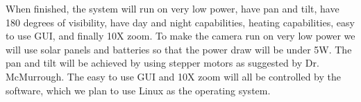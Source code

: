 When finished, the system will run on very low power, have pan and tilt, have 180 degrees of visibility, have day and night capabilities, heating capabilities, easy to use GUI, and finally 10X zoom. To make the camera run on very low power we will use solar panels and batteries so that the power draw will be under 5W. The pan and tilt will be achieved by using stepper motors as suggested by Dr. McMurrough. The easy to use GUI and 10X zoom will all be controlled by the software, which we plan to use Linux as the operating system.
